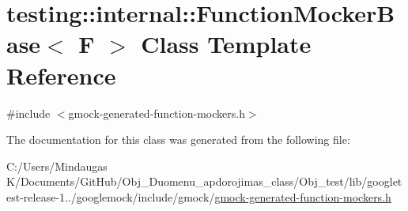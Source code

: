 \hypertarget{classtesting_1_1internal_1_1_function_mocker_base}{}\section{testing\+::internal\+::Function\+Mocker\+Base$<$ F $>$ Class Template Reference}
\label{classtesting_1_1internal_1_1_function_mocker_base}


{\ttfamily \#include $<$gmock-\/generated-\/function-\/mockers.\+h$>$}



The documentation for this class was generated from the following file\+:\begin{DoxyCompactItemize}
\item 
C\+:/\+Users/\+Mindaugas K/\+Documents/\+Git\+Hub/\+Obj\+\_\+\+Duomenu\+\_\+apdorojimas\+\_\+class/\+Obj\+\_\+test/lib/googletest-\/release-\/1../googlemock/include/gmock/\mbox{\hyperlink{_obj__test_2lib_2googletest-release-1_88_81_2googlemock_2include_2gmock_2gmock-generated-function-mockers_8h}{gmock-\/generated-\/function-\/mockers.\+h}}\end{DoxyCompactItemize}
